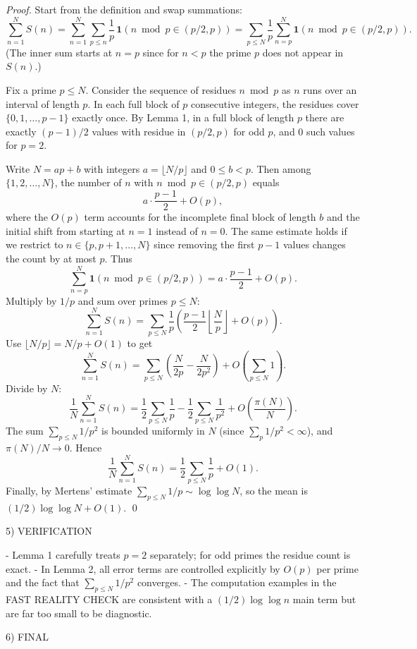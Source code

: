 \emph{Proof.}
Start from the definition and swap summations:
\[
\sum_{n=1}^N S(n)
= \sum_{n=1}^N\sum_{p\le n} \frac{1}{p}\,\mathbf 1(n\bmod p\in(p/2,p))
= \sum_{p\le N}\frac{1}{p}\sum_{n=p}^N \mathbf 1(n\bmod p\in(p/2,p)).
\]
(The inner sum starts at $n=p$ since for $n<p$ the prime $p$ does not appear in $S(n)$.)

Fix a prime $p\le N$. Consider the sequence of residues $n\bmod p$ as $n$ runs over an interval of length $p$.
In each full block of $p$ consecutive integers, the residues cover $\{0,1,\dots,p-1\}$ exactly once.
By Lemma 1, in a full block of length $p$ there are exactly $(p-1)/2$ values with residue in $(p/2,p)$ for odd $p$, and $0$ such values for $p=2$.

Write $N = ap + b$ with integers $a=\lfloor N/p\rfloor$ and $0\le b<p$.
Then among $\{1,2,\dots,N\}$, the number of $n$ with $n\bmod p\in(p/2,p)$ equals
\[
a\cdot \frac{p-1}{2} + O(p),
\]
where the $O(p)$ term accounts for the incomplete final block of length $b$ and the initial shift from starting at $n=1$ instead of $n=0$.
The same estimate holds if we restrict to $n\in\{p,p+1,\dots,N\}$ since removing the first $p-1$ values changes the count by at most $p$.
Thus
\[
\sum_{n=p}^N \mathbf 1(n\bmod p\in(p/2,p)) = a\cdot \frac{p-1}{2} + O(p).
\]
Multiply by $1/p$ and sum over primes $p\le N$:
\[
\sum_{n=1}^N S(n) = \sum_{p\le N} \frac{1}{p}\left(\frac{p-1}{2}\left\lfloor\frac{N}{p}\right\rfloor + O(p)\right).
\]
Use $\lfloor N/p\rfloor = N/p + O(1)$ to get
\[
\sum_{n=1}^N S(n) = \sum_{p\le N}\left(\frac{N}{2p} - \frac{N}{2p^2}\right) + O\left(\sum_{p\le N}1\right).
\]
Divide by $N$:
\[
\frac{1}{N}\sum_{n=1}^N S(n) = \frac12\sum_{p\le N}\frac{1}{p} - \frac12\sum_{p\le N}\frac{1}{p^2} + O\left(\frac{\pi(N)}{N}\right).
\]
The sum $\sum_{p\le N}1/p^2$ is bounded uniformly in $N$ (since $\sum_p1/p^2<\infty$), and $\pi(N)/N\to 0$.
Hence
\[
\frac{1}{N}\sum_{n=1}^N S(n) = \frac12\sum_{p\le N}\frac{1}{p} + O(1).
\]
Finally, by Mertens' estimate $\sum_{p\le N}1/p\sim\log\log N$, so the mean is $(1/2)\log\log N+O(1)$.
\qed

5) VERIFICATION

- Lemma 1 carefully treats $p=2$ separately; for odd primes the residue count is exact.
- In Lemma 2, all error terms are controlled explicitly by $O(p)$ per prime and the fact that $\sum_{p\le N}1/p^2$ converges.
- The computation examples in the FAST REALITY CHECK are consistent with a $(1/2)\log\log n$ main term but are far too small to be diagnostic.

6) FINAL

